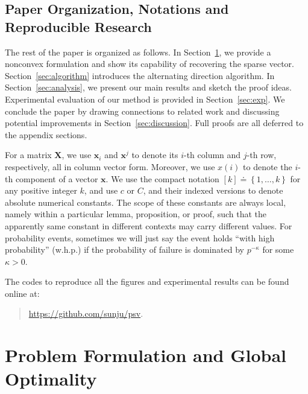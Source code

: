 \documentclass[11pt, journal, final]{IEEEtran}
\numberwithin{equation}{section}
\newcommand{\mb}{\mathbf}
\begin{document}
{\subsection{Paper Organization, Notations and Reproducible Research}
The rest of the paper is organized as follows. In Section~\ref{sec:optimality}, we provide a nonconvex formulation and show its capability of recovering the sparse vector. Section~\ref{sec:algorithm} introduces the alternating direction algorithm. In Section~\ref{sec:analysis}, we present our main results and sketch the proof ideas. Experimental evaluation of our method is provided in Section~\ref{sec:exp}. We conclude the paper by drawing connections to related work and discussing potential improvements in Section~\ref{sec:discussion}. Full proofs are all deferred to the appendix sections.

For a matrix $\mb X$, we use $\mb x_i$ and $\mb x^j$ to denote its $i$-th column and $j$-th row, respectively, all in column vector form. Moreover, we use $x(i)$ to denote the $i$-th component of a vector $\mb x$. We use the compact notation $[k] \doteq \left\{1, \dots, k\right\}$ for any positive integer $k$, and use $c$ or $C$, and their indexed versions to denote absolute numerical constants. The scope of these constants are always local, namely within a particular lemma, proposition, or proof, such that the apparently same constant in different contexts may carry different values. For probability events, sometimes we will just say the event holds ``with high probability'' (w.h.p.) if the probability of failure is dominated by $p^{-\kappa}$ for some $\kappa > 0$.

The codes to reproduce all the figures and experimental results can be found online at:
\begin{quote}
\centering
\url{https://github.com/sunju/psv}.
\end{quote}

\section{Problem Formulation and Global Optimality}\label{sec:optimality}

}
\end{document}
